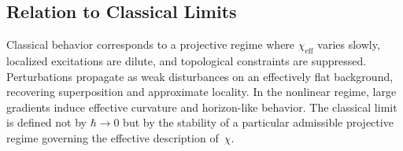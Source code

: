 \subsection{Relation to Classical Limits}
  \label{subsec:classical-limits}

  Classical behavior corresponds to a projective regime where
  $\chi_{\mathrm{eff}}$ varies slowly, localized excitations are dilute,
  and topological constraints are suppressed.
  Perturbations propagate as weak disturbances on an effectively flat
  background, recovering superposition and approximate locality.
  In the nonlinear regime, large gradients induce effective curvature and
  horizon-like behavior.
  The classical limit is defined not by $\hbar \to 0$ but by the
  stability of a particular admissible projective regime governing the
  effective description of~$\chi$.
